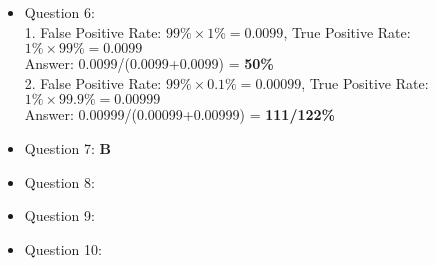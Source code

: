 \documentclass{article}
\begin{document}
\begin{itemize}
\item Question 6: \hfill \\
1. False Positive Rate: $99\% \times 1\% = 0.0099$, True Positive Rate:$1\% \times 99\% = 0.0099$ \\
Answer: 0.0099/(0.0099+0.0099) = \textbf{50\%}  \\
2. False Positive Rate: $99\% \times 0.1\% = 0.00099$, True Positive Rate:$1\% \times 99.9\% = 0.00999$ \\
Answer: 0.00999/(0.00099+0.00999) = \textbf{111/122\%} \\

\item Question 7:
\textbf{B}
\item Question 8:

\item Question 9:

\item Question 10:


\end{itemize}
\end{document}
